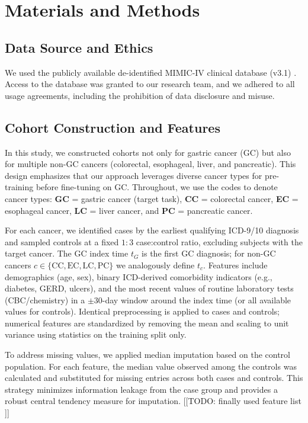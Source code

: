 \documentclass[diagnostics,article,submit,pdftex,moreauthors]{Definitions/mdpi}
\begin{document}


\section{Materials and Methods}

\subsection{Data Source and Ethics}
We used the publicly available de-identified MIMIC-IV clinical database (v3.1) \citep{Johnson2024MIMICIV}.
Access to the database was granted to our research team, and we adhered to all usage agreements, including the prohibition of data disclosure and misuse.

\subsection{Cohort Construction and Features}
In this study, we constructed cohorts not only for gastric cancer (GC) but also for multiple non-GC cancers (colorectal, esophageal, liver, and pancreatic).
This design emphasizes that our approach leverages diverse cancer types for pre-training before fine-tuning on GC.
Throughout, we use the codes to denote cancer types: \textbf{GC} = gastric cancer (target task), \textbf{CC} = colorectal cancer, \textbf{EC} = esophageal cancer, \textbf{LC} = liver cancer, and \textbf{PC} = pancreatic cancer.

For each cancer, we identified cases by the earliest qualifying ICD-9/10 diagnosis and sampled controls at a fixed $1{:}3$ case:control ratio, excluding subjects with the target cancer.
The GC index time $t_G$ is the first GC diagnosis; for non-GC cancers $c\in\{\mathrm{CC},\mathrm{EC},\mathrm{LC},\mathrm{PC}\}$ we analogously define $t_c$.
Features include demographics (age, sex), binary ICD-derived comorbidity indicators (e.g., diabetes, GERD, ulcers), and the most recent values of routine laboratory tests (CBC/chemistry) in a $\pm 30$-day window around the index time (or all available values for controls).
Identical preprocessing is applied to cases and controls; numerical features are standardized by removing the mean and scaling to unit variance using statistics on the training split only.

To address missing values, we applied median imputation based on the control population. 
For each feature, the median value observed among the controls was calculated and substituted for missing entries across both cases and controls. 
This strategy minimizes information leakage from the case group and provides a robust central tendency measure for imputation.
[[TODO: finally used feature list ]]
\end{document}
